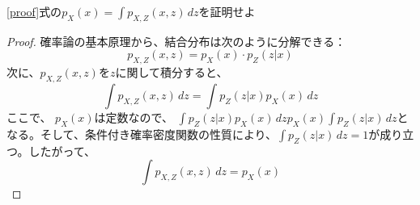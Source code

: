 \documentclass[a4paper]{jsarticle}%
\begin{document}
\begin{exercise}
  \eqref{proof}式の$p_X \left(x\right)=\int p_{X,Z}(x, z) \, dz$を証明せよ
\end{exercise}

\begin{proof}
確率論の基本原理から、結合分布は次のように分解できる：
\[
  p_{X,Z}(x, z) = p_X(x) \cdot p_{Z}(z|x)
\]
次に、$p_{X,Z}(x, z)$を$z$に関して積分すると、
\[
  \int p_{X,Z}(x,z) \, dz = \int p_{Z}(z|x) p_X(x) \, dz
\]
ここで、 $ p_X \left(x\right) $は定数なので、 $ \int p_{Z}(z|x) p_X(x) \, dzp_X \left(x\right)\int p_Z \left(z|x\right)\, dz $となる。そして、条件付き確率密度関数の性質により、$ \int p_Z \left(z|x\right)\, dz = 1 $が成り立つ。したがって、
$$ \int p_{X,Z}(x,z) \, dz = p_X \left(x\right) $$
\end{proof}
\end{document}

